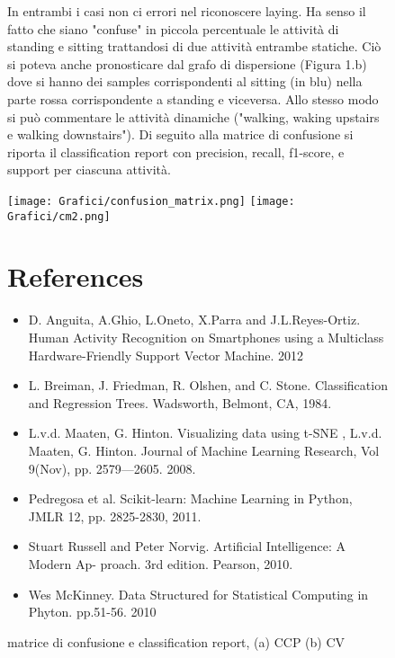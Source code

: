 \documentclass[]{article}
\begin{document}
\begin{figure}
In entrambi i casi non ci  errori nel riconoscere laying. Ha senso il fatto che siano "confuse" in piccola percentuale le attività di standing e sitting trattandosi di due attività entrambe statiche. Ciò si poteva anche pronosticare dal grafo di dispersione (Figura 1.b) dove si hanno dei samples corrispondenti al sitting (in blu) nella parte rossa corrispondente a standing e viceversa. Allo stesso modo si può commentare le attività dinamiche ("walking, waking upstairs e walking downstairs"). Di seguito alla matrice di confusione si riporta il classification report con precision, recall, f1-score, e support per ciascuna attività. 
\begin{center}

\texttt{[image: Grafici/confusion\_matrix.png]}
\hspace*{\fill}
\texttt{[image: Grafici/cm2.png]}

\hspace*{\fill}
\caption{matrice di confusione e classification report, (a) CCP (b) CV}
\end{center}


\section{References}
\begin{itemize}
\item []D. Anguita, A.Ghio, L.Oneto, X.Parra and J.L.Reyes-Ortiz. Human Activity Recognition on Smartphones
using a Multiclass Hardware-Friendly Support
Vector Machine. 2012
\item []L. Breiman, J. Friedman, R. Olshen, and C. Stone. Classification and Regression Trees. Wadsworth, Belmont, CA, 1984.
\item []L.v.d. Maaten, G. Hinton. Visualizing data using t-SNE , L.v.d. Maaten, G. Hinton. Journal of Machine Learning Research, Vol 9(Nov), pp. 2579—2605. 2008.
\item []Pedregosa et al. Scikit-learn: Machine Learning in Python, JMLR 12, pp. 2825-2830, 2011.
\item []Stuart Russell and Peter Norvig. Artificial Intelligence: A Modern Ap-
proach. 3rd edition. Pearson, 2010.
\item []Wes McKinney. Data Structured for Statistical Computing in Phyton. pp.51-56. 2010
\end{itemize}
\end{figure}
\end{document}
